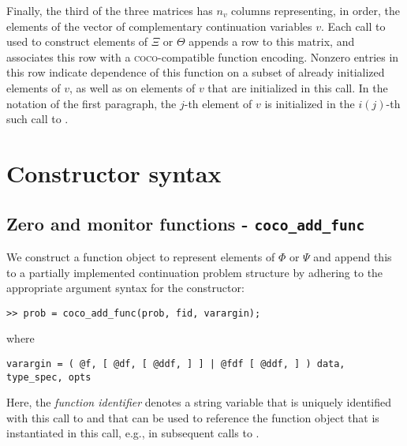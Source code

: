 Finally, the third of the three matrices has $n_v$ columns representing, in order, the elements of the vector of complementary continuation variables $v$. Each call to  used to construct elements of $\Xi$ or $\Theta$ appends a row to this matrix, and associates this row with a \textsc{coco}-compatible function encoding. Nonzero entries in this row indicate dependence of this function on a subset of already initialized elements of $v$, as well as on elements of $v$ that are initialized in this call. In the notation of the first paragraph, the $j$-th element of $v$ is initialized in the $i(j)$-th such call to .

\section{Constructor syntax}

\subsection{Zero and monitor functions - \texttt{coco\_add\_func}}
We construct a function object to represent elements of $\Phi$ or $\Psi$ and append this to a partially implemented continuation problem structure  by adhering to the appropriate argument syntax for the  constructor:
\begin{lstlisting}[language=coco-highlight]
>> prob = coco_add_func(prob, fid, varargin);
\end{lstlisting}
where
\begin{lstlisting}[language=coco-highlight]
varargin = ( @f, [ @df, [ @ddf, ] ] | @fdf [ @ddf, ] ) data, type_spec, opts
\end{lstlisting}
Here, the \emph{function identifier}  denotes a string variable that is uniquely identified with this call to  and that can be used to reference the function object that is instantiated in this call, e.g., in subsequent calls to .

